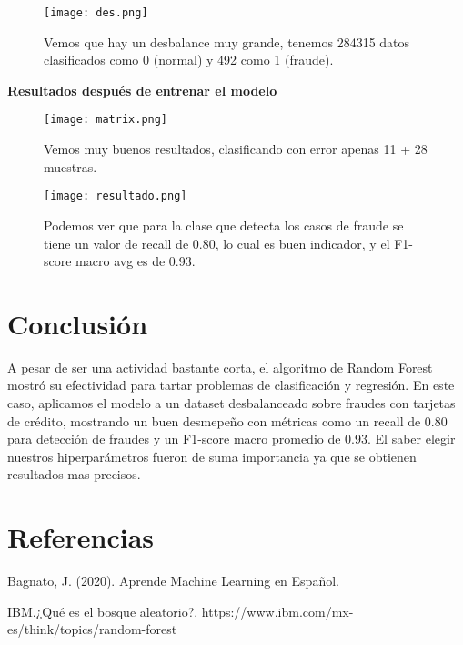 \documentclass{article}
\begin{document}
\begin{figure}[H]
    \centering
    \texttt{[image: des.png]}
    \caption{Vemos que hay un desbalance muy grande, tenemos 284315 datos clasificados como 0 (normal) y 492 como 1 (fraude).}
    \label{fig:enter-label}
\end{figure}

\textbf{Resultados después de entrenar el modelo}

\begin{figure}[H]
    \centering
\texttt{[image: matrix.png]}
    \caption{{\small Vemos muy buenos resultados, clasificando con error apenas 11 + 28 muestras.}}
    \label{fig:enter-label}
\end{figure}
\begin{figure}[H]
\centering\texttt{[image: resultado.png]}
\caption{{\small Podemos ver que para la clase que detecta los casos de fraude se tiene un valor de recall de 0.80, lo cual es buen indicador, y el F1-score macro avg es de 0.93.}}
    \label{fig:enter-label}
\end{figure}

\section{Conclusión}
A pesar de ser una actividad bastante corta, el algoritmo de Random Forest mostró su efectividad para tartar problemas de clasificación y regresión. En este caso, aplicamos el modelo a un dataset desbalanceado sobre fraudes con tarjetas de crédito, mostrando un buen desmepeño con métricas como un recall de 0.80 para detección de fraudes y un F1-score macro promedio de 0.93. El saber elegir nuestros hiperparámetros fueron de suma importancia ya que se obtienen resultados mas precisos.


\section{Referencias}
Bagnato, J. (2020). Aprende Machine Learning en Español.

IBM.¿Qué es el bosque aleatorio?. https://www.ibm.com/mx-es/think/topics/random-forest
\end{document}
